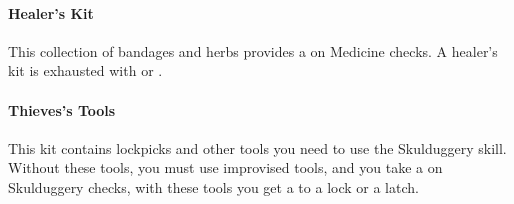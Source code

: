 \begin{multicols}{2}
\paragraph{Healer's Kit} \label{kititm:healerskit}
This collection of bandages and herbs provides a \boost on
Medicine checks. A healer's kit is exhausted with
\threat\threat\threat or \despair.

\paragraph{Thieves's Tools} \label{kititm:thievestools}
This kit contains lockpicks and other tools you need to
use the Skulduggery skill. Without these tools, you must
use improvised tools, and you take a \setback on Skulduggery
checks, with these tools you get a \boost to a lock or a latch.

\end{multicols}
